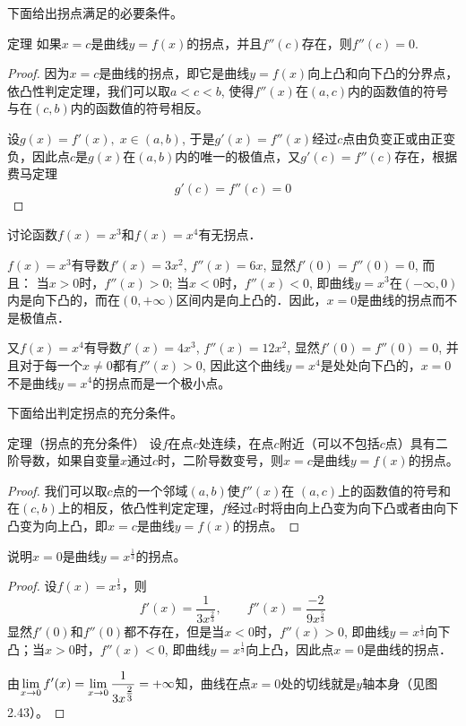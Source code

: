 下面给出拐点满足的必要条件。

\begin{blk}
    {定理} 如果$x=c$是曲线$y=f(x)$的拐点，并且$f''(c)$存在，则$f''(c)=0$.
\end{blk}

\begin{proof}
    因为$x=c$是曲线的拐点，即它是曲线$y=f(x)$向上凸和向下凸的分界点，依凸性判定定理，我们可以取$a<c<b$, 使得$f''(x)$在$(a,c)$内的函数值的符号与在$(c,b)$内的函数值的符号相反。

设$g(x)=f'(x),\; x\in (a,b)$, 于是$g'(x)=f''(x)$经过$c$点由负变正或由正变负，因此点$c$是$g(x)$在$(a,b)$内的唯一的极值点，又$g'(c)=f''(c)$存在，根据费马定理
\[g' (c) =f'' (c) =0\]
\end{proof}


\begin{example}
    讨论函数$f(x)=x^3$和$f(x)=x^4$有无拐点．
\end{example}


\begin{solution}
    $f(x)=x^3$有导数$f'(x)=3x^2$, $f''(x)=6x$, 显然$f'(0)=f''(0)=0$, 而且：
当$x>0$时，$f''(x)>0$; 当$x<0$时，$f''(x)<0$, 即曲线$y=x^3$在$(-\infty, 0)$内是向下凸的，而在$(0,+\infty)$区间内是向上凸的．因此，$x=0$是曲线的拐点而不是极值点．

又$f(x)=x^4$有导数$f'(x)=4x^3$, $f''(x)=12x^2$, 显然$f'(0)=f''(0)=0$, 并且对于每一个$x\ne 0$都有$f''(x)>0$, 因此这个曲线$y=x^4$是处处向下凸的，$x=0$不是曲线$y=x^4$的拐点而是一个极小点。
\end{solution}


下面给出判定拐点的充分条件。
    
\begin{blk}
   {定理（拐点的充分条件）} 设$f$在点$c$处连续，在点$c$附近（可以不包括$c$点）具有二阶导数，如果自变量$x$通过$c$时，二阶导数变号，则$x=c$是曲线$y=f(x)$的拐点。
\end{blk}

\begin{proof}
    我们可以取$c$点的一个邻域$(a,b)$使$f''(x)$在
$(a,c)$上的函数值的符号和在$(c,b)$上的相反，依凸性判定定理，$f$经过$c$时将由向上凸变为向下凸或者由向下凸变为向上凸，即$x=c$是曲线$y=f(x)$的拐点。
\end{proof}


\begin{example}
说明$x=0$是曲线$y=x^{\tfrac{1}{3}}$的拐点。
\end{example}

\begin{proof}
    设$f(x)=x^{\tfrac{1}{3}}$，则
\[f'(x)=\frac{1}{3x^{\tfrac{2}{3}}},\qquad f''(x)=\frac{-2}{9x^{\tfrac{5}{3}}}\]
显然$f'(0)$和$f''(0)$都不存在，但是当$x<0$时，$f''(x)>0$, 即曲线$y=x^{\tfrac{1}{3}}$向下凸；当$x>0$时，$f''(x)<0$, 即曲线$y=x^{\tfrac{1}{3}}$向上凸，因此点$x=0$是曲线的拐点．

由$\displaystyle\lim_{x\to 0}f'(x)=\displaystyle\lim_{x\to 0}\dfrac{1}{3x^{\tfrac{2}{3}}}=+\infty$知，曲线在点$x=0$处的切线就是$y$轴本身（见图2.43）。
\end{proof}


